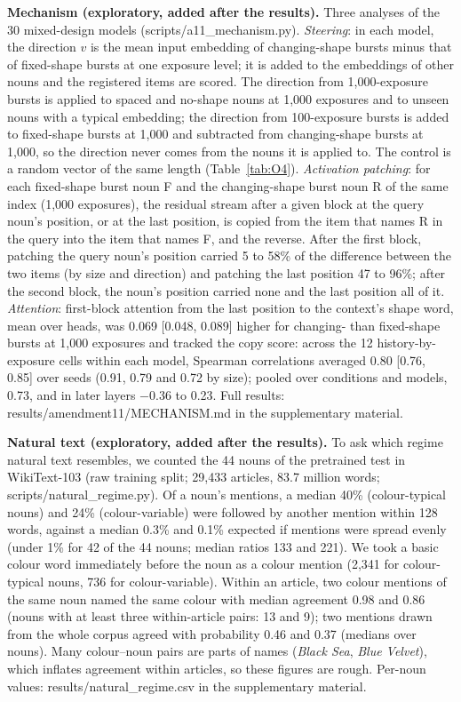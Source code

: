 \textbf{Mechanism (exploratory, added after the results).} Three analyses of the 30 mixed-design models (scripts/a11\_mechanism.py). \emph{Steering}: in each model, the direction $v$ is the mean input embedding of changing-shape bursts minus that of fixed-shape bursts at one exposure level; it is added to the embeddings of other nouns and the registered items are scored. The direction from 1,000-exposure bursts is applied to spaced and no-shape nouns at 1,000 exposures and to unseen nouns with a typical embedding; the direction from 100-exposure bursts is added to fixed-shape bursts at 1,000 and subtracted from changing-shape bursts at 1,000, so the direction never comes from the nouns it is applied to. The control is a random vector of the same length (Table~\ref{tab:O4}). \emph{Activation patching}: for each fixed-shape burst noun F and the changing-shape burst noun R of the same index (1,000 exposures), the residual stream after a given block at the query noun's position, or at the last position, is copied from the item that names R in the query into the item that names F, and the reverse. After the first block, patching the query noun's position carried 5 to 58\% of the difference between the two items (by size and direction) and patching the last position 47 to 96\%; after the second block, the noun's position carried none and the last position all of it. \emph{Attention}: first-block attention from the last position to the context's shape word, mean over heads, was 0.069 [0.048, 0.089] higher for changing- than fixed-shape bursts at 1,000 exposures and tracked the copy score: across the 12 history-by-exposure cells within each model, Spearman correlations averaged 0.80 [0.76, 0.85] over seeds (0.91, 0.79 and 0.72 by size); pooled over conditions and models, 0.73, and in later layers $-$0.36 to 0.23. Full results: results/amendment11/MECHANISM.md in the supplementary material.

\textbf{Natural text (exploratory, added after the results).} To ask which regime natural text resembles, we counted the 44 nouns of the pretrained test in WikiText-103 (raw training split; 29,433 articles, 83.7 million words; scripts/natural\_regime.py). Of a noun's mentions, a median 40\% (colour-typical nouns) and 24\% (colour-variable) were followed by another mention within 128 words, against a median 0.3\% and 0.1\% expected if mentions were spread evenly (under 1\% for 42 of the 44 nouns; median ratios 133 and 221). We took a basic colour word immediately before the noun as a colour mention (2,341 for colour-typical nouns, 736 for colour-variable). Within an article, two colour mentions of the same noun named the same colour with median agreement 0.98 and 0.86 (nouns with at least three within-article pairs: 13 and 9); two mentions drawn from the whole corpus agreed with probability 0.46 and 0.37 (medians over nouns). Many colour--noun pairs are parts of names (\emph{Black Sea}, \emph{Blue Velvet}), which inflates agreement within articles, so these figures are rough. Per-noun values: results/natural\_regime.csv in the supplementary material.

